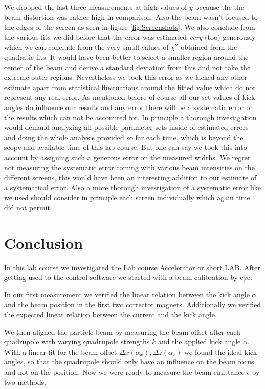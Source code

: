 \documentclass[11pt,a4paper,notitlepage]{scrartcl}
\begin{document}
We dropped the last three measurements at high values of $y$ because the the beam distortion was rather high in comparison. Also the beam wasn't focused to the edges of the screen as seen in figure \ref{fig:Screenshots}. We also conclude from the various fits we did before that the error was estimated \emph{very} (too) generously which we can conclude from the very small values of $\chi^2$ obtained from the quadratic fits. It would have been better to select a smaller region around the center of the beam and derive a standard deviation from this and not take the extreme outer regions. Nevertheless we took this error as we lacked any other estimate apart from statistical fluctuations around the fitted value which do not represent any real error. As mentioned before of course all our set values of kick angles do influence our results and any error there will be a systematic error on the results which can not be accounted for. In principle a thorough investigation would demand analyzing all possible parameter sets inside of estimated errors and doing the whole analysis provided so far each time, which is beyond the scope and available time of this lab course. But one can say we took this into account by assigning such a generous error on the measured widths. We regret not measuring the systematic error coming with various beam intensities on the different screens, this would have been an interesting addition to our estimate of a systematical error. Also a more thorough investigation of a systematic error like we used should consider in principle each screen individually which again time did not permit.
\newpage
\section{Conclusion}
\label{sec:conc}
In this lab course we investigated the  Lab course Accelerator or short LAB. After getting used to the control software we started with a beam calibration by eye. 

In our first measurement we verified the linear relation between the kick angle $\alpha$ and the beam position in the first two corrector magnets. Additionally we verified the expected linear relation between the current and the kick angle. 

We then aligned the particle beam by measuring the beam offset after each quadrupole with varying quadrupole strengths $k$ and the applied kick angle $\alpha$. With a linear fit for the beam offset $\Delta x(\alpha_x), \Delta z(\alpha_z)$ we found the ideal kick angles, so that the quadrupole should only have an influence on the beam focus and not on the position. Now we were ready to measure the beam emittance $\epsilon$ by two methods.
\end{document}
